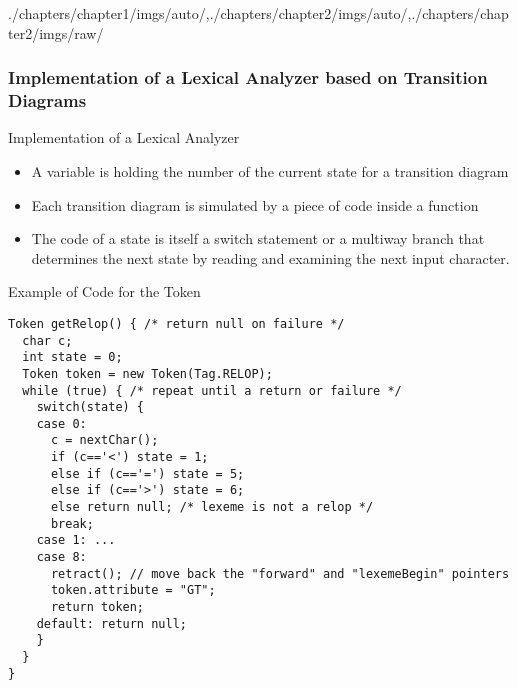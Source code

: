 \begin{graphicspathcontext}{{./chapters/chapter1/imgs/auto/},{./chapters/chapter2/imgs/auto/},{./chapters/chapter2/imgs/raw/}}
\begin{bibunit}[apalike]
\subsubsection{Implementation of a Lexical Analyzer based on Transition Diagrams}
\subsubsectiontableofcontentslide

\begin{frame}{Implementation of a Lexical Analyzer}
	\begin{itemize}
	\item A variable is holding the number of the current state for a transition diagram
	\vspace{.5cm}
	\item Each transition diagram is simulated by a piece of code inside a function
	\vspace{.5cm}
	\item The code of a state is itself a switch statement or a multiway branch that determines the next state by reading and examining the next input character.
	\end{itemize}
\end{frame}

\begin{frame}[t,fragile]{Example of Code for the Token }
	\begin{lstlisting}[style=lststyle-java]
Token getRelop() { /* return null on failure */
  char c;
  int state = 0;
  Token token = new Token(Tag.RELOP);
  while (true) { /* repeat until a return or failure */
    switch(state) {
    case 0: 
      c = nextChar();
      if (c=='<') state = 1;
      else if (c=='=') state = 5;
      else if (c=='>') state = 6;
      else return null; /* lexeme is not a relop */
      break;
    case 1: ...
    case 8:
      retract(); // move back the "forward" and "lexemeBegin" pointers
      token.attribute = "GT";
      return token;
    default: return null;
    }
  }
}
	\end{lstlisting}
\end{frame}


\end{bibunit}
\end{graphicspathcontext}
